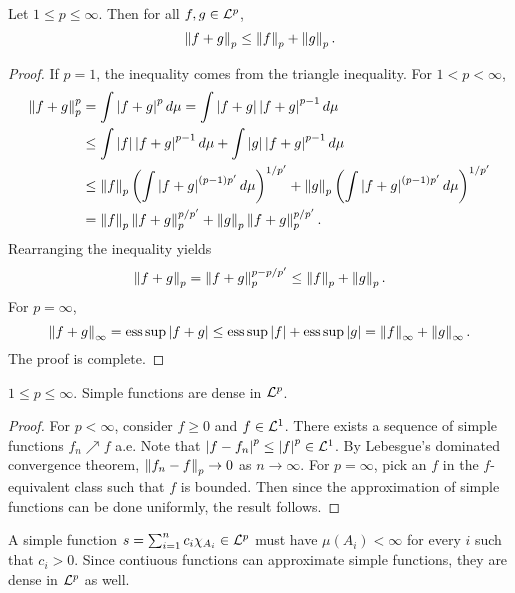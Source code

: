 \begin{theorem}
    Let $1\leq p\leq\infty$. Then for all $f,g\in\mathcal{L}^p$, 
    \begin{equation*}
        \left\lVert {f+g} \right\rVert_p \leq \left\lVert {f} \right\rVert_p + \left\lVert {g} \right\rVert_p.
    \end{equation*}
\end{theorem}
\begin{proof}
    If $p = 1$, the inequality comes from the triangle inequality. 
    For $1<p<\infty$, 
    \begin{equation*}
        \begin{split}
            \norm{f+g}_p^p &= \int \abs{f+g}^pd\mu 
            = \int \abs{f+g}\abs{f+g}^{p-1}d\mu \\
            &\leq \int \abs{f}\abs{f+g}^{p-1}d\mu + \int \abs{g}\abs{f+g}^{p-1}d\mu \\
            &\leq \norm{f}_p\pth{\int \abs{f+g}^{(p-1)p'}d\mu}^{1/p'} + \norm{g}_p\pth{\int \abs{f+g}^{(p-1)p'}d\mu}^{1/p'} \\
            &= \norm{f}_p\norm{f+g}_p^{p/p'} + \norm{g}_p\norm{f+g}_p^{p/p'}.
        \end{split}
    \end{equation*}
    Rearranging the inequality yields 
    \begin{equation*}
        \left\lVert {f+g} \right\rVert_p = \left\lVert {f+g} \right\rVert_p^{p-p/p'} \leq \left\lVert {f} \right\rVert_p + \left\lVert {g} \right\rVert_p.
    \end{equation*}
    For $p = \infty$, 
    \begin{equation*}
        \left\lVert {f+g} \right\rVert_\infty = \operatorname{ess\,sup} \left\lvert {f+g} \right\rvert \leq \operatorname{ess\,sup} \left\lvert {f} \right\rvert + \operatorname{ess\,sup} \left\lvert {g} \right\rvert = \left\lVert {f} \right\rVert_\infty + \left\lVert {g} \right\rVert_\infty.
    \end{equation*}
    The proof is complete.
\end{proof}

\begin{theorem}\label{thm:simple_dense}
    $1\leq p\leq \infty$. Simple functions are dense in $\mathcal{L}^p$.
\end{theorem}
\begin{proof}
    For $p<\infty$, consider $f\geq 0$ and $f\in\mathcal{L}^1$. There exists a 
    sequence of simple functions $f_n\nearrow f$ a.e. Note that 
    $\left\lvert {f-f_n} \right\rvert^p\leq\left\lvert {f} \right\rvert^p\in\mathcal{L}^1$. By Lebesgue's dominated 
    convergence theorem, $\left\lVert {f_n-f} \right\rVert_p\to 0$ as $n\to\infty$. 
    For $p=\infty$, pick an $f$ in the $f$-equivalent class 
    such that $f$ is bounded. Then since the approximation of 
    simple functions can be done uniformly, the result follows.
\end{proof}
\begin{remark}
    A simple function $s = \sum_{i=1}^n c_i\chi_{A_i}\in\mathcal{L}^p$ must have 
    $\mu(A_i)<\infty$ for every $i$ such that $c_i > 0$. Since 
    contiuous functions can approximate simple functions, 
    they are dense in $\mathcal{L}^p$ as well.
\end{remark}

